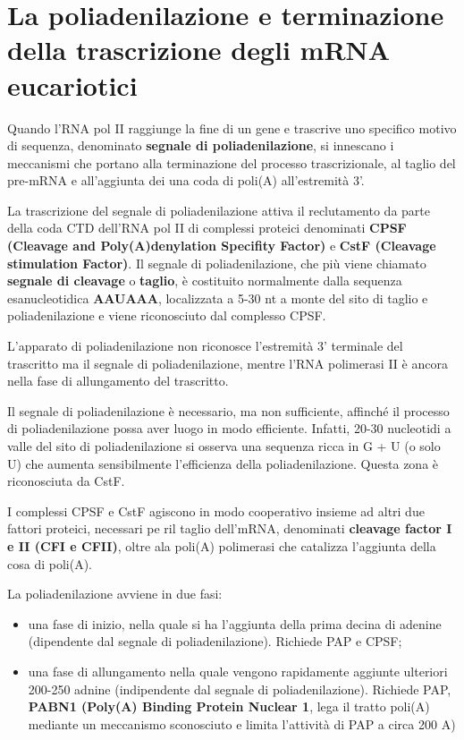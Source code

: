 \documentclass[11pt]{book}
\begin{document}
\section{La poliadenilazione e terminazione della trascrizione
degli mRNA
eucariotici}\label{la-poliadenilazione-e-terminazione-della-trascrizione-degli-mrna-eucariotici}

Quando l'RNA pol II raggiunge la fine di un gene e trascrive uno
specifico motivo di sequenza, denominato \textbf{segnale di
poliadenilazione}, si innescano i meccanismi che portano alla
terminazione del processo trascrizionale, al taglio del pre-mRNA e
all'aggiunta dei una coda di poli(A) all'estremità 3'.

La trascrizione del segnale di poliadenilazione attiva il reclutamento da
parte della coda CTD dell'RNA pol II di complessi proteici denominati
\textbf{CPSF (Cleavage and Poly(A)denylation Specifity Factor)} e
\textbf{CstF (Cleavage stimulation Factor)}. Il segnale di
poliadenilazione, che più viene chiamato \textbf{segnale di cleavage} o
\textbf{taglio}, è costituito normalmente dalla sequenza esanucleotidica
\textbf{AAUAAA}, localizzata a 5-30 nt a monte del sito di taglio e
poliadenilazione e viene riconosciuto dal complesso CPSF.

L'apparato di poliadenilazione non riconosce l'estremità 3' terminale
del trascritto ma il segnale di poliadenilazione, mentre l'RNA
polimerasi II è ancora nella fase di allungamento del trascritto.

Il segnale di poliadenilazione è necessario, ma non sufficiente,
affinché il processo di poliadenilazione possa aver luogo in modo
efficiente. Infatti, 20-30 nucleotidi a valle del sito di
poliadenilazione si osserva una sequenza ricca in G + U (o solo U) che
aumenta sensibilmente l'efficienza della poliadenilazione. Questa zona è
riconosciuta da CstF.

I complessi CPSF e CstF agiscono in modo cooperativo insieme ad altri
due fattori proteici, necessari pe ril taglio dell'mRNA, denominati
\textbf{cleavage factor I e II (CFI e CFII)}, oltre ala poli(A)
polimerasi che catalizza l'aggiunta della cosa di poli(A).

La poliadenilazione avviene in due fasi:

\begin{itemize}
\itemsep1pt\parskip0pt
\item
  una fase di inizio, nella quale si ha l'aggiunta della prima decina di
  adenine (dipendente dal segnale di poliadenilazione). Richiede PAP e
  CPSF;
\item
  una fase di allungamento nella quale vengono rapidamente aggiunte
  ulteriori 200-250 adnine (indipendente dal segnale di
  poliadenilazione). Richiede PAP, \textbf{PABN1 (Poly(A) Binding
  Protein Nuclear 1}, lega il tratto poli(A) mediante un meccanismo
  sconosciuto e limita l'attività di PAP a circa 200 A)
\end{itemize}
\end{document}
